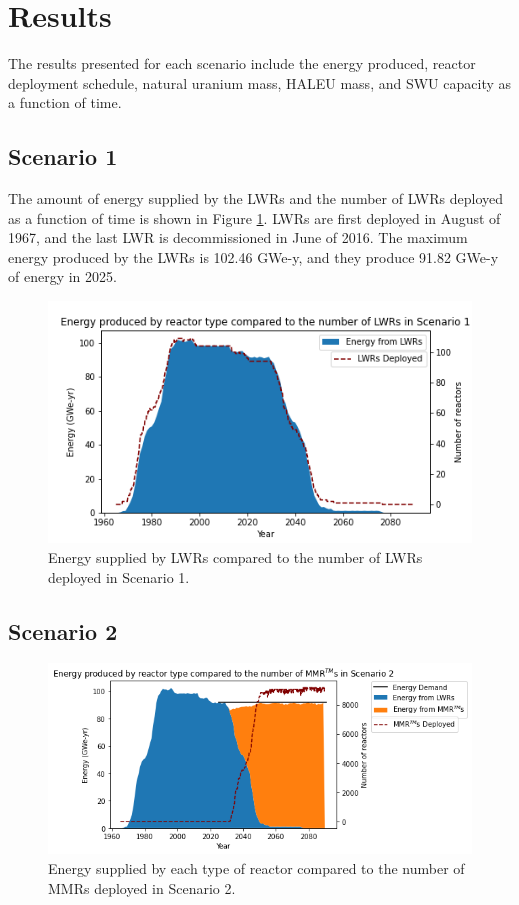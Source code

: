 \section{Results}
The results presented for each scenario include the energy produced, reactor 
deployment schedule, natural
uranium mass, \gls{HALEU} mass, and \gls{SWU} capacity as a function of time. 

\subsection{Scenario 1}
The amount of energy supplied by the \glspl{LWR} and the number of \glspl{LWR}
deployed as a function of time is shown in Figure \ref{fig:energy_rx_1}. 
\glspl{LWR} are first deployed in August of 1967, and the last 
\gls{LWR} is decommissioned in June of 2016. The maximum energy produced 
by the \glspl{LWR} is 102.46 GWe-y, and they produce 91.82 GWe-y of 
energy in 2025. 

\begin{figure}
    \centering 
    \includegraphics[scale=0.5]{figures/energy_scenario1.png}
    \caption{Energy supplied by \glspl{LWR} compared to the number of 
    \glspl{LWR} deployed in Scenario 1.}
    \label{fig:energy_rx_1}
\end{figure}


\subsection{Scenario 2}

\begin{figure}
    \centering 
    \includegraphics[scale=0.5]{figures/energy_scenario2.png}
    \caption{Energy supplied by each type of reactor compared to the number of 
    \glspl{MMR} deployed in Scenario 2.}
    \label{fig:energy_rx_2}
\end{figure}

